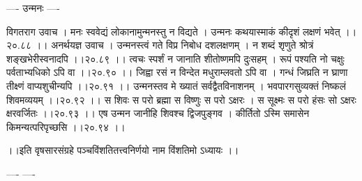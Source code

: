 \documentclass[11pt]{book}
\begin{document}
\begin{landscape}
---- उन्मनः ----

विगतराग उवाच ।
मनः स्ववेद्यं लोकानामुन्मनस्तु न विद्यते ।
उन्मनः कथयास्माकं कीदृशं लक्षणं भवेत् ।।२०.८८ ।।
अनर्थयज्ञ उवाच ।
उन्मनस्त्वं गते विप्र निबोध दशलक्षणम् ।
न शब्दं शृणुते श्रोत्रं शङ्खभेरीस्वनादपि ।।२०.८९ ।।
त्वचः स्पर्शं न जानाति शीतोष्णमपि दुःसहम् ।
रूपं पश्यति नो चक्षुः पर्वताभ्यधिको ऽपि वा ।।२०.९० ।।
जिह्वा रसं न विन्देत मधुराम्लवतो ऽपि वा ।
गन्धं जिघ्रति न घ्राणा तीक्ष्णं वाप्यशुचीन्यपि ।।२०.९१ ।।
उन्मनस्तव मे ख्यातं सर्वद्वैतविनाशनम् ।
भवपारगसुव्यक्तं निष्कलं शिवमव्ययम् ।।२०.९२ ।।
स शिवः स परो ब्रह्मा स विष्णुः स परो ऽक्षरः ।
स सूक्ष्मः स परो हंसः सो ऽक्षरः क्षरवर्जितः ।।२०.९३ ।।
एष उन्मन जानीहि शिवश्च द्विजपुङ्गव ।
कीर्तितो ऽस्मि समासेन किमन्यत्परिपृच्छसि ।।२०.९४ ।।

 ।।इति वृषसारसंग्रहे पञ्चविंशतितत्त्वनिर्णयो नाम विंशतिमो ऽध्यायः ।।





----   ----


\end{landscape}
\end{document}
